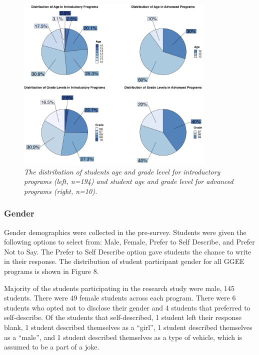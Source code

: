 \documentclass[
]{article}
\begin{document}
\begin{figure}
\centering
\includegraphics[width=0.85\textwidth,height=\textheight]{Graphs/Report/GGEE_23_AgeGrade_IA.jpg}
\caption{\emph{The distribution of students age and grade level for
introductory programs (left, n=194) and student age and grade level for
advanced programs (right, n=10).}}
\end{figure}

\hypertarget{gender}{%
\subsubsection{Gender}\label{gender}}

Gender demographics were collected in the pre-survey. Students were
given the following options to select from: Male, Female, Prefer to Self
Describe, and Prefer Not to Say. The Prefer to Self Describe option gave
students the chance to write in their response. The distribution of
student participant gender for all GGEE programs is shown in Figure 8.

Majority of the students participating in the research study were male,
145 students. There were 49 female students across each program. There
were 6 students who opted not to disclose their gender and 4 students
that preferred to self-describe. Of the students that self-described, 1
student left their response blank, 1 student described themselves as a
``girl'', 1 student described themselves as a ``male'', and 1 student
described themselves as a type of vehicle, which is assumed to be a part
of a joke.
\end{document}
